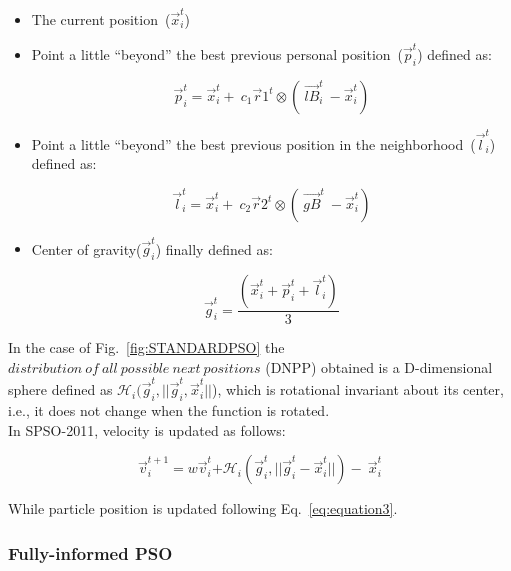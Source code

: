 \begin{itemize}
    \item The current position~(${\vec{x}}_i^t$)
    \item Point a little “beyond” the best previous personal position~(${\vec{p}}_i^t$) defined as:
    
    \begin{equation}\label{eq:bestpreviouspersonal position}
        {\vec{p}}_i^t={\vec{x}}_i^t+\ c_1{\vec{r}}1^t\otimes(\ {\vec{lB}}_i^t\ - {\vec{x}}_i^t)
    \end{equation}
    
    \item Point a little “beyond” the best previous position in the neighborhood~($ {\vec{l}}_i^t$) defined as:

      \begin{equation}\label{eq:best previous position in the neighbourhood}
        {\vec{l}}_i^t={\vec{x}}_i^t+\ c_2{\vec{r}}2^t\otimes(\ {\vec{gB}}^t\ - {\vec{x}}_i^t)
    \end{equation}
    
    \item Center of gravity(${\vec{g}}_i^t$) finally defined as:
    
    \begin{equation}\label{eq:gravitycentre}
        {\vec{g}}_i^t=\frac{\left({\vec{x}}_i^t+{\vec{p}}_i^t+{\vec{l}}_i^t\right)}{3}
    \end{equation}
    
\end{itemize}


In the case of Fig.~\ref{fig:STANDARDPSO} the $distribution~of~all~possible~next~positions$ (DNPP) obtained is a D-dimensional sphere defined as $\mathcal{H}_i({\vec{g}}_i^t, ||\vec{g}_i^t,\vec{x}_i^t||$), which is rotational invariant about its center, i.e., it does not change when the function is rotated.\\
In SPSO-2011, velocity is updated as follows:


\begin{equation}
       {\vec{v}}_i^{t+1}=w{\vec{v}}_i^t{+\mathcal{H}}_i({\vec{g}}_i^t,||\vec{g}_i^t - \vec{x}_i^t||)-\ {\vec{x}}_i^t
\end{equation}


While particle position is updated following Eq.~\eqref{eq:equation3}.

\subsubsection{Fully-informed PSO}

